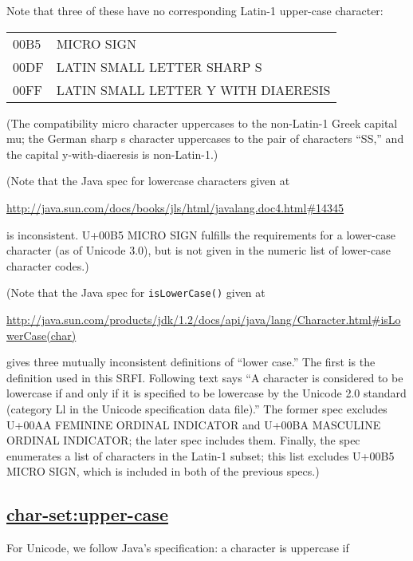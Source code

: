 Note that three of these have no corresponding Latin-1 upper-case
character:

\begin{longtable}[]{@{}ll@{}}
\toprule
00B5 & MICRO SIGN\tabularnewline
00DF & LATIN SMALL LETTER SHARP S\tabularnewline
00FF & LATIN SMALL LETTER Y WITH DIAERESIS\tabularnewline
\bottomrule
\end{longtable}

(The compatibility micro character uppercases to the non-Latin-1 Greek
capital mu; the German sharp s character uppercases to the pair of
characters ``SS,'' and the capital y-with-diaeresis is non-Latin-1.)

(Note that the Java spec for lowercase characters given at

\url{http://java.sun.com/docs/books/jls/html/javalang.doc4.html\#14345}

is inconsistent. U+00B5 MICRO SIGN fulfills the requirements for a
lower-case character (as of Unicode 3.0), but is not given in the
numeric list of lower-case character codes.)

(Note that the Java spec for \texttt{isLowerCase()} given at

\url{http://java.sun.com/products/jdk/1.2/docs/api/java/lang/Character.html\#isLowerCase(char)}

gives three mutually inconsistent definitions of ``lower case.'' The
first is the definition used in this SRFI. Following text says ``A
character is considered to be lowercase if and only if it is specified
to be lowercase by the Unicode 2.0 standard (category Ll in the Unicode
specification data file).'' The former spec excludes U+00AA FEMININE
ORDINAL INDICATOR and U+00BA MASCULINE ORDINAL INDICATOR; the later spec
includes them. Finally, the spec enumerates a list of characters in the
Latin-1 subset; this list excludes U+00B5 MICRO SIGN, which is included
in both of the previous specs.)

\subsection{\texorpdfstring{\href{}{char-set:upper-case}}{char-set:upper-case}}\label{char-setupper-case}

For Unicode, we follow Java's specification: a character is uppercase if

